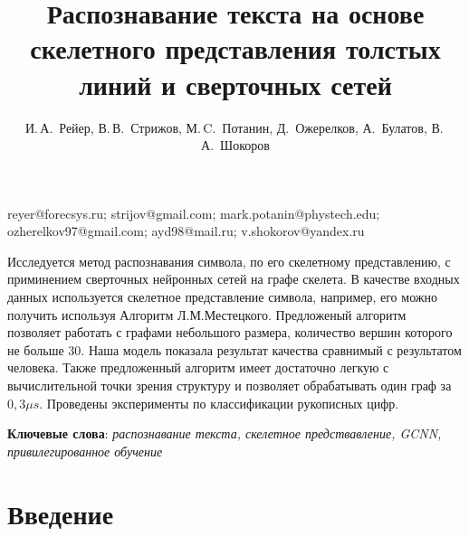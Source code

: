 \documentclass[12pt, twoside]{article}
\begin{document}
\title
    [Шаблон статьи для публикации] %
    {Распознавание текста на основе скелетного представления толстых линий и сверточных сетей}
\author
    { И.\,А.~Рейер, В.\,В.~Стрижов, М.\,C.~Потанин, Д.~Ожерелков, А.~Булатов, В.\,А.~Шокоров}

\email
    {reyer@forecsys.ru; strijov@gmail.com; mark.potanin@phystech.edu; ozherelkov97@gmail.com; ayd98@mail.ru; v.shokorov@yandex.ru}
\abstract
    {
    	Исследуется метод распознавания символа, по его скелетному представлению, с приминением сверточных нейронных сетей на графе скелета. В качестве входных данных используется скелетное представление символа, например, его можно получить используя Алгоритм Л.М.Местецкого. Предложеный алгоритм позволяет работать с графами небольшого размера, количество вершин которого не больше 30. Наша модель показала результат качества сравнимый с результатом человека. Также предложенный алгоритм имеет достаточно легкую с вычислительной точки зрения структуру и позволяет обрабатывать один граф за $0,3 \mu s$.
        Проведены эксперименты по классификации рукописных цифр.
    	
\bigskip
\noindent
\textbf{Ключевые слова}: \emph {распознавание текста, скелетное предствавление, GCNN, привилегированное обучение}
}



\maketitle


\section{Введение}
\end{document}

